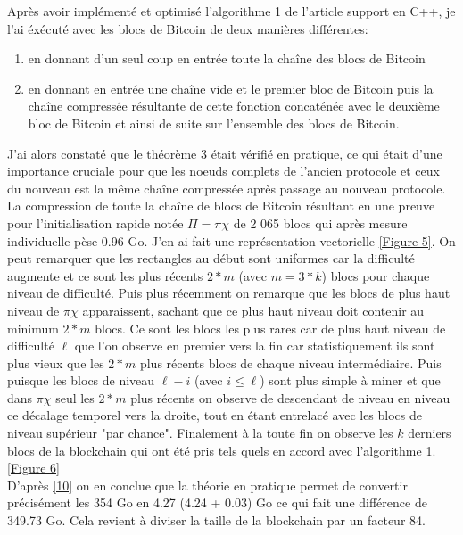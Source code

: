 \documentclass[12pt,a4paper]{article}
\newcommand{\source}[1]{\hyperlink{#1}{[#1]}}
\newcommand{\annexe}[2]{\hyperlink{#1}{[Figure #2]}}
\begin{document}
	Après avoir implémenté et optimisé l'algorithme 1 de l'article support en C++, je l'ai éxécuté avec les blocs de Bitcoin de deux manières différentes:\\
	\begin{enumerate}
		\item en donnant d'un seul coup en entrée toute la chaîne des blocs de Bitcoin\\
	  \item en donnant en entrée une chaîne vide et le premier bloc de Bitcoin puis la chaîne compressée résultante de cette fonction concaténée avec le deuxième bloc de Bitcoin et ainsi de suite sur l'ensemble des blocs de Bitcoin.\\
	\end{enumerate}
	
	J'ai alors constaté que le théorème 3 était vérifié en pratique, ce qui était d'une importance cruciale pour que les noeuds complets de l'ancien protocole et ceux du nouveau est la même chaîne compressée après passage au nouveau protocole.\\
	
	La compression de toute la chaîne de blocs de Bitcoin résultant en une preuve pour l'initialisation rapide notée $\Pi = \pi\chi$ de 2 065 blocs qui après mesure individuelle pèse 0.96 Go. J'en ai fait une représentation vectorielle \annexe{25}{5}. On peut remarquer que les rectangles au début sont uniformes car la difficulté augmente et ce sont les plus récents $2*m$ (avec $m = 3*k$) blocs pour chaque niveau de difficulté. Puis plus récemment on remarque que les blocs de plus haut niveau de $\pi\chi$ apparaissent, sachant que ce plus haut niveau doit contenir au minimum $2*m$ blocs. Ce sont les blocs les plus rares car de plus haut niveau de difficulté $\ell$ que l'on observe en premier vers la fin car statistiquement ils sont plus vieux que les $2*m$ plus récents blocs de chaque niveau intermédiaire. Puis puisque les blocs de niveau $\ell - i$ (avec $i \leq \ell$) sont plus simple à miner et que dans $\pi\chi$ seul les $2*m$ plus récents on observe de descendant de niveau en niveau ce décalage temporel vers la droite, tout en étant entrelacé avec les blocs de niveau supérieur "par chance". Finalement à la toute fin on observe les $k$ derniers blocs de la blockchain qui ont été pris tels quels en accord avec l'algorithme 1. \annexe{26}{6}\\
D'après \source{10} on en conclue que la théorie en pratique permet de convertir précisément les 354 Go en 4.27 (4.24 + 0.03) Go ce qui fait une différence de 349.73 Go. Cela revient à diviser la taille de la blockchain par un facteur 84.\\
	
\end{document}
